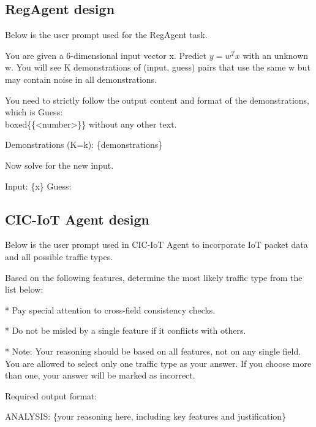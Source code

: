 \documentclass[11pt]{article}
\theoremstyle{plain}
\theoremstyle{definition}
\begin{document}
{\subsection{RegAgent design}
\label{app:regagent}
Below is the user prompt used for the RegAgent task.

\begin{tcolorbox}[userbox]
You are given a 6-dimensional input vector x. Predict $y = w^Tx$ with an unknown w. You will see K demonstrations of (input, guess) pairs that use the same w but may contain noise in all demonstrations.

You need to strictly follow the output content and format of the demonstrations, which is Guess: \\boxed\{\{<number>\}\} without any other text.

Demonstrations (K={k}):
\{demonstrations\}

Now solve for the new input.

Input: \{x\}
Guess:
\end{tcolorbox}

\subsection{CIC-IoT Agent design}
\label{app:cic-iot}
Below is the user prompt used in CIC-IoT Agent to incorporate IoT packet data and all possible traffic types.
\begin{tcolorbox}[userbox]
Based on the following features, determine the most likely traffic type from the list below:

* Pay special attention to cross-field consistency checks.

* Do not be misled by a single feature if it conflicts with others.

* Note: Your reasoning should be based on all features, not on any single 
field. You are allowed to select only one traffic type as your answer. If you choose more than one, your answer will be marked as incorrect.

Required output format:

ANALYSIS:
\{your reasoning here, including key features and justification\}


\end{tcolorbox}}
\end{document}
